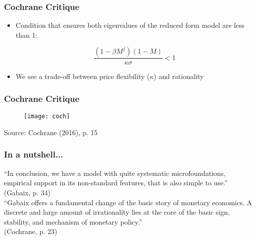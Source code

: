 \documentclass{beamer}
\begin{document}

\begin{frame}
	\frametitle{Cochrane Critique}
	\begin{itemize}
		\item Condition that ensures both eigenvalues of the reduced form model are less than 1:
		\begin{center}
			$$\frac{(1 - \beta M^{f})(1 - M)}{\kappa\sigma} < 1$$
		\end{center}
		\vspace{8pt}
		\item We see a trade-off between price flexibility ($\kappa$) and rationality
	\end{itemize}
\end{frame}


\begin{frame}
	\frametitle{Cochrane Critique}
	\begin{figure}[h]
		\texttt{[image: coch]}
	\end{figure}
	{\footnotesize Source: Cochrane (2016), p. 15}
\end{frame}


\begin{frame}
	\frametitle{In a nutshell...}
	``In conclusion, we have a model with quite systematic microfoundations, empirical support in its non-standard features, that is also simple to use.'' (Gabaix, p. 34)\\
	\vspace{10pt}
	``Gabaix offers a fundamental change of the basic story of monetary economics. A discrete and large amount of irrationality lies at the core of the basic sign, stability, and mechanism of monetary policy.''\\ (Cochrane, p. 23)
\end{frame}

\end{document}
